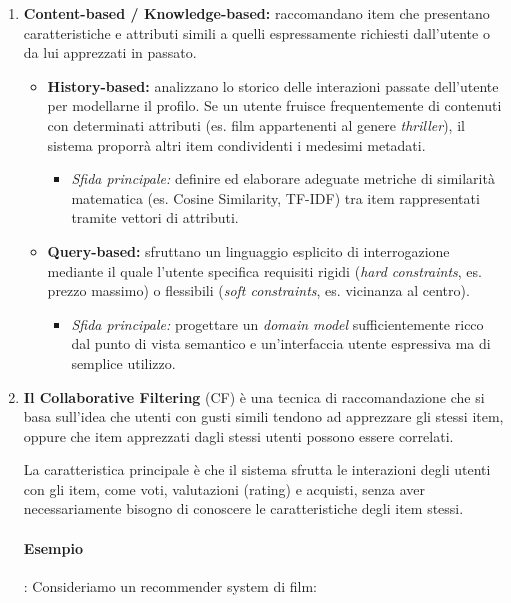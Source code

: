 \begin{enumerate}
    \item \textbf{Content-based / Knowledge-based:} raccomandano item che presentano caratteristiche e attributi simili a quelli espressamente richiesti dall'utente o da lui apprezzati in passato.
    \begin{itemize}
        \item \textbf{History-based:} analizzano lo storico delle interazioni passate dell'utente per modellarne il profilo. Se un utente fruisce frequentemente di contenuti con determinati attributi (es. film appartenenti al genere \textit{thriller}), il sistema proporrà altri item condividenti i medesimi metadati.
        \begin{itemize}
            \item \textit{Sfida principale:} definire ed elaborare adeguate metriche di similarità matematica (es. Cosine Similarity, TF-IDF) tra item rappresentati tramite vettori di attributi.
        \end{itemize}
        
        \item \textbf{Query-based:} sfruttano un linguaggio esplicito di interrogazione mediante il quale l'utente specifica requisiti rigidi (\textit{hard constraints}, es. prezzo massimo) o flessibili (\textit{soft constraints}, es. vicinanza al centro).
        \begin{itemize}
            \item \textit{Sfida principale:} progettare un \textit{domain model} sufficientemente ricco dal punto di vista semantico e un'interfaccia utente espressiva ma di semplice utilizzo.
        \end{itemize}
    \end{itemize}

    \item \textbf{Il Collaborative Filtering} (CF) è una tecnica di raccomandazione che si basa sull'idea che utenti con gusti simili tendono ad apprezzare gli stessi item, oppure che item apprezzati dagli stessi utenti possono essere correlati.

    La caratteristica principale è che il sistema sfrutta le interazioni degli utenti con gli item, come voti, valutazioni (rating) e acquisti, senza aver necessariamente bisogno di conoscere le caratteristiche degli item stessi.

    \paragraph{Esempio} :  Consideriamo un recommender system di film:


\end{enumerate}

